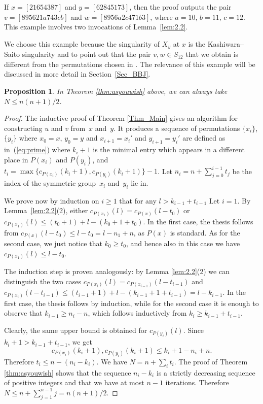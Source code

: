 \documentclass[10pt,a4paper]{amsart}
\numberwithin{equation}{section}
\newtheorem{Proposition}[Theorem]{Proposition}
 { \theoremstyle{definition}
\newtheorem{Definition}[Theorem]{Definition}
\newtheorem{Example}[Theorem]{Example}
\newtheorem{Remark}[Theorem]{Remark} }
\begin{document}
\begin{Example}\label{eg:ks}
If $x=[2 1 6 5 4 3 8 7]$ and $y=[62845173]$, then the proof outputs the pair $v=[895621a743cb]$ and $w=[8956a2c471b3]$, where $a=10$, $b=11$, $c=12$. This example involves two invocations of Lemma~\ref{lem:2.2}.
\end{Example}

We choose this example because the singularity of $X_y$ at $x$ is the Kashiwara--Saito singularity \cite[Example~8.3.1]{kashiwarasaito} and to point out that the pair $v,w\in S_{12}$ that we obtain is different from the permutations chosen in \cite[Section~3.5]{williamson}. The relevance of this example will be discussed in more detail in Section~\ref{Sec_BBJ}.

\begin{Proposition}\label{prop:bound}
In Theorem {\rm \ref{thm:asyouwish}} above, we can always take $N\leq n(n+1)/2$.
\end{Proposition}

\begin{proof}
The inductive proof of Theorem \ref{Thm_Main} gives an algorithm for constructing $u$ and $v$ from~$x$ and~$y$. It produces a sequence of permutations $\{x_i\}$, $\{y_i\}$ where $x_0=x$, $y_0=y$ and $x_{i+1}=x_i'$ and $y_{i+1}=y_i'$ are defined as in~(\ref{eq:prime}) where $k_i+1$ is the minimal entry which appears in a different place in $P(x_i)$ and $P(y_i)$, and $t_i=\max\{c_{P(x_i)}(k_i+1),c_{P(y_i)}(k_i+1)\}-1$. Let $n_i=n+\sum_{j=0}^{i-1}t_j$ be the index of the symmetric group~$x_i$ and~$y_i$ lie in.

We prove now by induction on $i\geq 1$ that for any $l>k_{i-1}+t_{i-1}$
Let $i=1$. By Lemma~\ref{lem:2.2}(2), either $c_{P(x_1)}(l)=c_{P(x)}(l-t_0)$ or $c_{P(x_1)}(l)\leq (t_0+1)+l-(k_0+1+t_0)$. In the first case,
the thesis follows from $c_{P(x)}(l-t_0)\leq l-t_0=l-n_1+n$, as $P(x)$ is standard. As for the second case, we just notice that $k_0\geq t_0$, and hence also in this case we have $c_{P(x_1)}(l)\leq l-t_0$.

The induction step is proven analogously: by Lemma \ref{lem:2.2}(2) we can distinguish the two cases $c_{P(x_i)}(l)=c_{P(x_{i-1})}(l-t_{i-1})$ and $c_{P(x_i)}(l-t_{i-1})\leq (t_{i-1}+1)+l-(k_{i-1}+1+t_{i-1})=l-k_{i-1}$. In the first case, the thesis follows by induction, while for the second case it is enough to observe that $k_{i-1}\geq n_i-n$, which follows inductively from $k_i\geq k_{i-1}+t_{i-1}$.

Clearly, the same upper bound is obtained for $c_{P(y_i)}(l)$. Since $k_{i}+1> k_{i-1}+t_{i-1}$, we get
\[
c_{P(x_i)}(k_i+1), c_{P(y_i)}(k_i+1)\leq k_i+1-n_i+n.
\]
Therefore $t_i\leq n-(n_i-k_i)$. We have $N=n+\sum_i t_i$. The proof of Theorem \ref{thm:asyouwish} shows that the sequence $n_i-k_i$ is a strictly decreasing sequence of positive integers and that we have at most $n-1$ iterations. Therefore $N\leq n+\sum_{j=1}^{n-1}j=n(n+1)/2$.
\end{proof}
\end{document}
